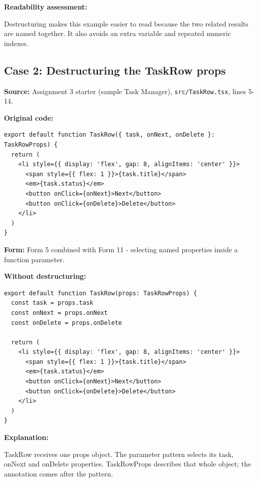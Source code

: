 \documentclass[
  10pt,
  a4paper,
  titlepage]{article}
\newcommand{\passthrough}[1]{#1}
\begin{document}
\textbf{Readability assessment:}

Destructuring makes this example easier to read because the two related
results are named together. It also avoids an extra variable and
repeated numeric indexes.

\subsection{Case 2: Destructuring the TaskRow
props}\label{case-2-destructuring-the-taskrow-props}

\textbf{Source:} Assignment 3 starter (sample Task Manager),
\passthrough{\lstinline!src/TaskRow.tsx!}, lines 5-14.

\textbf{Original code:}

\Needspace{82.4pt}
\begin{lstlisting}[language=TSX]
export default function TaskRow({ task, onNext, onDelete }: TaskRowProps) {
  return (
    <li style={{ display: 'flex', gap: 8, alignItems: 'center' }}>
      <span style={{ flex: 1 }}>{task.title}</span>
      <em>{task.status}</em>
      <button onClick={onNext}>Next</button>
      <button onClick={onDelete}>Delete</button>
    </li>
  )
}
\end{lstlisting}

\textbf{Form:} Form 5 combined with Form 11 - selecting named properties
inside a function parameter.


\textbf{Without destructuring:}

\Needspace{82.4pt}
\begin{lstlisting}[language=TSX]
export default function TaskRow(props: TaskRowProps) {
  const task = props.task
  const onNext = props.onNext
  const onDelete = props.onDelete

  return (
    <li style={{ display: 'flex', gap: 8, alignItems: 'center' }}>
      <span style={{ flex: 1 }}>{task.title}</span>
      <em>{task.status}</em>
      <button onClick={onNext}>Next</button>
      <button onClick={onDelete}>Delete</button>
    </li>
  )
}
\end{lstlisting}


\textbf{Explanation:}

TaskRow receives one props object. The parameter pattern selects its
task, onNext and onDelete properties. TaskRowProps describes that whole
object; the annotation comes after the pattern.
\end{document}
